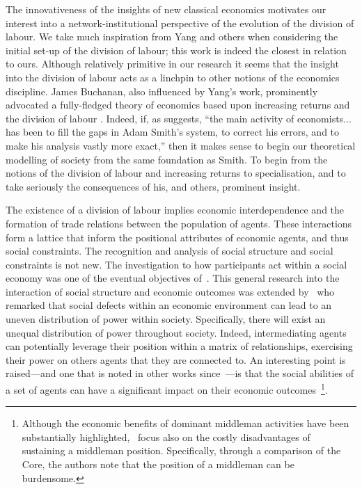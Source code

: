The innovativeness of the insights of new classical economics motivates our interest into a network-institutional perspective of the evolution of the division of labour. We take much inspiration from Yang and others when considering the initial set-up of the division of labour; this work is indeed the closest in relation to ours. Although relatively primitive in our research it seems that the insight into the division of labour acts as a linchpin to other notions of the economics discipline. James Buchanan, also influenced by Yang's work, prominently advocated a fully-fledged theory of economics based upon increasing returns and the division of labour \citep{BuchananYoon1994}. Indeed, if, as \citet[p.~713]{Coase1992} suggests, ``the main activity of economists... has been to fill the gaps in Adam Smith's system, to correct his errors, and to make his analysis vastly more exact,'' then it makes sense to begin our theoretical modelling of society from the same foundation as Smith. To begin from the notions of the division of labour and increasing returns to specialisation, and to take seriously the consequences of his, and others, prominent insight.

\medskip \noindent The existence of a division of labour implies economic interdependence and the formation of trade relations between the population of agents. These interactions form a lattice that inform the positional attributes of economic agents, and thus social constraints. The recognition and analysis of social structure and social constraints is not new. The investigation to how participants act within a social economy was one of the eventual objectives of~\citet{vNM}. This general research into the interaction of social structure and economic outcomes was extended by~\citet{KalaiMiddlemen1978} who remarked that social defects within an economic environment can lead to an uneven distribution of power within society. Specifically, there will exist an unequal distribution of power throughout society. Indeed, intermediating agents can potentially leverage their position within a matrix of relationships, exercising their power on others agents that they are connected to. An interesting point is raised---and one that is noted in other works since~\citet{Granovetter2005}---is that the social abilities of a set of agents can have a significant impact on their economic outcomes~\footnote{Although the economic benefits of dominant middleman activities have been substantially highlighted,~\citet{KalaiMiddlemen1978} focus also on the costly disadvantages of sustaining a middleman position. Specifically, through a comparison of the Core, the authors note that the position of a middleman can be burdensome.}.

